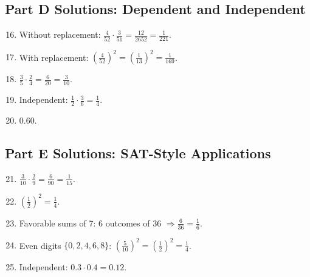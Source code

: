 \documentclass[12pt]{article}
\begin{document}
\subsection*{Part D Solutions: Dependent and Independent}
\begin{enumerate}
  \setcounter{enumi}{15}
  \item Without replacement: \(\tfrac{4}{52}\cdot\tfrac{3}{51}=\tfrac{12}{2652}=\boxed{\tfrac{1}{221}}\).
  \item With replacement: \((\tfrac{4}{52})^2=(\tfrac{1}{13})^2=\tfrac{1}{169}\).
  \item \(\tfrac{3}{5}\cdot\tfrac{2}{4}=\tfrac{6}{20}=\tfrac{3}{10}\).
  \item Independent: \(\tfrac{1}{2}\cdot\tfrac{3}{6}=\tfrac{1}{4}\).
  \item \(0.60\).
\end{enumerate}

\subsection*{Part E Solutions: SAT-Style Applications}
\begin{enumerate}
  \setcounter{enumi}{20}
  \item \(\tfrac{3}{10}\cdot\tfrac{2}{9}=\tfrac{6}{90}=\tfrac{1}{15}\).
  \item \((\tfrac{1}{2})^2=\tfrac{1}{4}\).
  \item Favorable sums of 7: 6 outcomes of 36 \(\Rightarrow \tfrac{6}{36}=\tfrac{1}{6}\).
  \item Even digits \(\{0,2,4,6,8\}\): \((\tfrac{5}{10})^2=(\tfrac{1}{2})^2=\tfrac{1}{4}\).
  \item Independent: \(0.3\cdot0.4=0.12\).
\end{enumerate}
\end{document}
